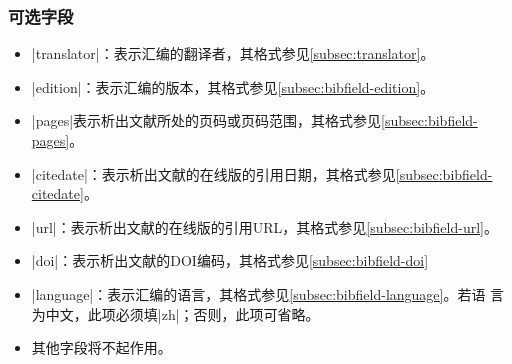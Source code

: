 \subsubsection{可选字段}

\begin{itemize}
\item |translator|：表示汇编的翻译者，其格式参见\ref{subsec:translator}。
\item |edition|：表示汇编的版本，其格式参见\ref{subsec:bibfield-edition}。
\item |pages|表示析出文献所处的页码或页码范围，其格式参见\ref{subsec:bibfield-pages}。
\item |citedate|：表示析出文献的在线版的引用日期，其格式参见\ref{subsec:bibfield-citedate}。
\item |url|：表示析出文献的在线版的引用URL，其格式参见\ref{subsec:bibfield-url}。
\item |doi|：表示析出文献的DOI编码，其格式参见\ref{subsec:bibfield-doi}
\item |language|：表示汇编的语言，其格式参见\ref{subsec:bibfield-language}。若语
  言为中文，此项必须填|zh|；否则，此项可省略。
\item 其他字段将不起作用。
\end{itemize}
